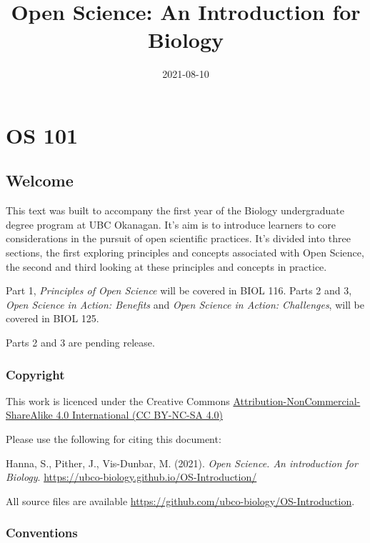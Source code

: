 \documentclass[
]{book}
\title{Open Science: An Introduction for Biology}
\author{}
\date{\vspace{-2.5em}2021-08-10}
\begin{document}
\maketitle

{
\setcounter{tocdepth}{1}
\tableofcontents
}
\hypertarget{part-os-101}{%
\part*{OS 101}\label{part-os-101}}

\hypertarget{welcome}{%
\chapter*{Welcome}\label{welcome}}

This text was built to accompany the first year of the Biology undergraduate degree program at UBC Okanagan. It's aim is to introduce learners to core considerations in the pursuit of open scientific practices. It's divided into three sections, the first exploring principles and concepts associated with Open Science, the second and third looking at these principles and concepts in practice.

Part 1, \emph{Principles of Open Science} will be covered in BIOL 116. Parts 2 and 3, \emph{Open Science in Action: Benefits} and \emph{Open Science in Action: Challenges}, will be covered in BIOL 125.

Parts 2 and 3 are pending release.

\hypertarget{copyright}{%
\section*{Copyright}\label{copyright}}

This work is licenced under the Creative Commons \href{https://creativecommons.org/licenses/by-nc-sa/4.0/}{Attribution-NonCommercial-ShareAlike 4.0 International (CC BY-NC-SA 4.0)}

Please use the following for citing this document:

Hanna, S., Pither, J., Vis-Dunbar, M. (2021). \emph{Open Science. An introduction for Biology}. \url{https://ubco-biology.github.io/OS-Introduction/}

All source files are available \url{https://github.com/ubco-biology/OS-Introduction}.

\hypertarget{conventions}{%
\section*{Conventions}\label{conventions}}
\end{document}
